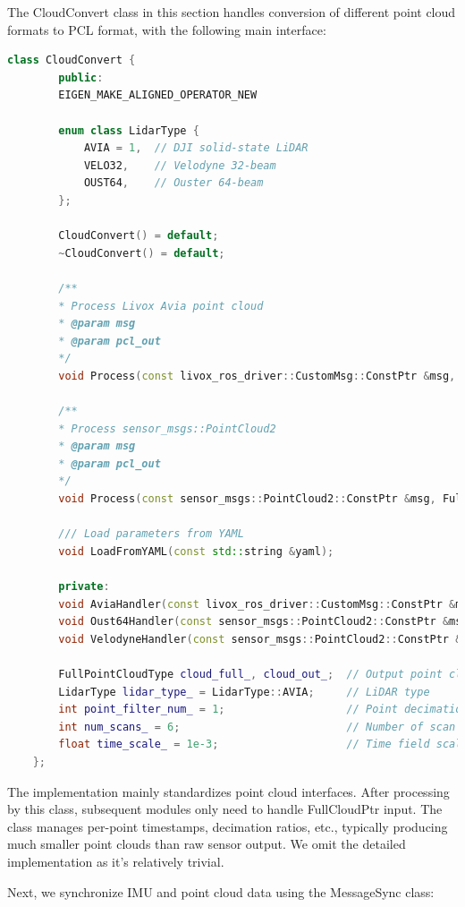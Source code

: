 The CloudConvert class in this section handles conversion of different point cloud formats to PCL format, with the following main interface:

\begin{lstlisting}[language=c++,caption=src/ch7/loosly_coupled_lio/cloud_convert.h]
	class CloudConvert {
		public:
		EIGEN_MAKE_ALIGNED_OPERATOR_NEW
		
		enum class LidarType {
			AVIA = 1,  // DJI solid-state LiDAR
			VELO32,    // Velodyne 32-beam
			OUST64,    // Ouster 64-beam
		};
		
		CloudConvert() = default;
		~CloudConvert() = default;
		
		/**
		* Process Livox Avia point cloud
		* @param msg
		* @param pcl_out
		*/
		void Process(const livox_ros_driver::CustomMsg::ConstPtr &msg, FullCloudPtr &pcl_out);
		
		/**
		* Process sensor_msgs::PointCloud2
		* @param msg
		* @param pcl_out
		*/
		void Process(const sensor_msgs::PointCloud2::ConstPtr &msg, FullCloudPtr &pcl_out);
		
		/// Load parameters from YAML
		void LoadFromYAML(const std::string &yaml);
		
		private:
		void AviaHandler(const livox_ros_driver::CustomMsg::ConstPtr &msg);
		void Oust64Handler(const sensor_msgs::PointCloud2::ConstPtr &msg);
		void VelodyneHandler(const sensor_msgs::PointCloud2::ConstPtr &msg);
		
		FullPointCloudType cloud_full_, cloud_out_;  // Output point cloud
		LidarType lidar_type_ = LidarType::AVIA;     // LiDAR type
		int point_filter_num_ = 1;                   // Point decimation ratio
		int num_scans_ = 6;                          // Number of scan beams
		float time_scale_ = 1e-3;                    // Time field scaling factor
	};
\end{lstlisting}

The implementation mainly standardizes point cloud interfaces. After processing by this class, subsequent modules only need to handle FullCloudPtr input. The class manages per-point timestamps, decimation ratios, etc., typically producing much smaller point clouds than raw sensor output. We omit the detailed implementation as it's relatively trivial.

Next, we synchronize IMU and point cloud data using the MessageSync class:

